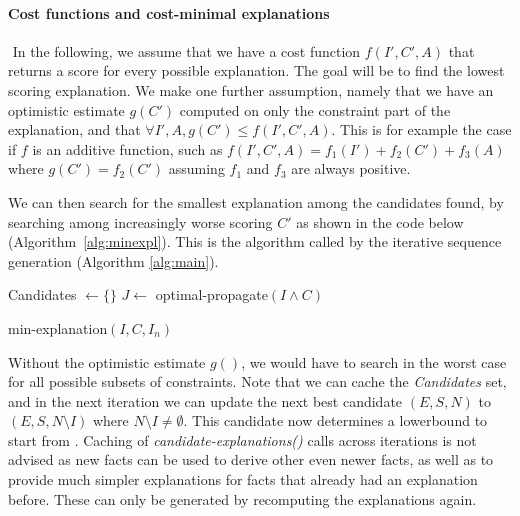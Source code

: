 \paragraph{Cost functions and cost-minimal explanations}
$ $   
In the following, we assume that we have a cost function $f(I', C', A)$ that returns a score for every possible explanation. The goal will be to find the lowest scoring explanation. We make one further assumption, namely that we have an optimistic estimate $g(C')$ computed on only the constraint part of the explanation, and that $\forall I', A, g(C') \leq f(I', C', A)$. This is for example the case if $f$ is an additive function, such as $f(I', C', A) = f_1(I') + f_2(C') + f_3(A)$ where $g(C') = f_2(C')$ assuming $f_1$ and $f_3$ are always positive.

We can then search for the smallest explanation among the candidates found, by searching among increasingly worse scoring $C'$ as shown in the code below (Algorithm~\ref{alg:minexpl}). This is the algorithm called by the iterative sequence generation (Algorithm \ref{alg:main}).

\begin{algorithm}


  Candidates $\gets \{\}$\;
  $J \gets$ optimal-propagate$(I \wedge C)$\;
\caption{min-explanation$(I,C,I_n)$}
\label{alg:minexpl}
\end{algorithm}

Without the optimistic estimate $g()$, we would have to search in the worst case for all possible subsets of constraints. Note that we can cache the \textit{Candidates} set, and in the next iteration we can update the next best candidate $(E, S, N)$ to $(E, S, N \setminus I)$ where $N \setminus I \neq \emptyset$. This candidate now determines a lowerbound to start from .
Caching of \textit{candidate-explanations()} calls across iterations is not advised as new facts can be used to derive other even newer facts, as well as to provide much simpler explanations for facts that already had an explanation before. These can only be generated by recomputing the explanations again. %

